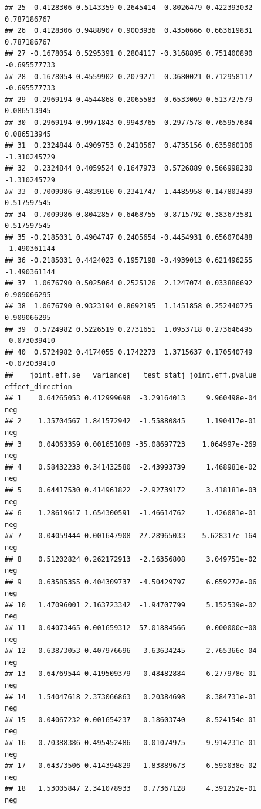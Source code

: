 \documentclass[
]{article}
\begin{document}
\begin{verbatim}
## 25  0.4128306 0.5143359 0.2645414  0.8026479 0.422393032  0.787186767
## 26  0.4128306 0.9488907 0.9003936  0.4350666 0.663619831  0.787186767
## 27 -0.1678054 0.5295391 0.2804117 -0.3168895 0.751400890 -0.695577733
## 28 -0.1678054 0.4559902 0.2079271 -0.3680021 0.712958117 -0.695577733
## 29 -0.2969194 0.4544868 0.2065583 -0.6533069 0.513727579  0.086513945
## 30 -0.2969194 0.9971843 0.9943765 -0.2977578 0.765957684  0.086513945
## 31  0.2324844 0.4909753 0.2410567  0.4735156 0.635960106 -1.310245729
## 32  0.2324844 0.4059524 0.1647973  0.5726889 0.566998230 -1.310245729
## 33 -0.7009986 0.4839160 0.2341747 -1.4485958 0.147803489  0.517597545
## 34 -0.7009986 0.8042857 0.6468755 -0.8715792 0.383673581  0.517597545
## 35 -0.2185031 0.4904747 0.2405654 -0.4454931 0.656070488 -1.490361144
## 36 -0.2185031 0.4424023 0.1957198 -0.4939013 0.621496255 -1.490361144
## 37  1.0676790 0.5025064 0.2525126  2.1247074 0.033886692  0.909066295
## 38  1.0676790 0.9323194 0.8692195  1.1451858 0.252440725  0.909066295
## 39  0.5724982 0.5226519 0.2731651  1.0953718 0.273646495 -0.073039410
## 40  0.5724982 0.4174055 0.1742273  1.3715637 0.170540749 -0.073039410
##    joint.eff.se   variancej   test_statj joint.eff.pvalue effect_direction
## 1    0.64265053 0.412999698  -3.29164013     9.960498e-04              neg
## 2    1.35704567 1.841572942  -1.55880845     1.190417e-01              neg
## 3    0.04063359 0.001651089 -35.08697723    1.064997e-269              neg
## 4    0.58432233 0.341432580  -2.43993739     1.468981e-02              neg
## 5    0.64417530 0.414961822  -2.92739172     3.418181e-03              neg
## 6    1.28619617 1.654300591  -1.46614762     1.426081e-01              neg
## 7    0.04059444 0.001647908 -27.28965033    5.628317e-164              neg
## 8    0.51202824 0.262172913  -2.16356808     3.049751e-02              neg
## 9    0.63585355 0.404309737  -4.50429797     6.659272e-06              neg
## 10   1.47096001 2.163723342  -1.94707799     5.152539e-02              neg
## 11   0.04073465 0.001659312 -57.01884566     0.000000e+00              neg
## 12   0.63873053 0.407976696  -3.63634245     2.765366e-04              neg
## 13   0.64769544 0.419509379   0.48482884     6.277978e-01              neg
## 14   1.54047618 2.373066863   0.20384698     8.384731e-01              neg
## 15   0.04067232 0.001654237  -0.18603740     8.524154e-01              neg
## 16   0.70388386 0.495452486  -0.01074975     9.914231e-01              neg
## 17   0.64373506 0.414394829   1.83889673     6.593038e-02              neg
## 18   1.53005847 2.341078933   0.77367128     4.391252e-01              neg

\end{verbatim}
\end{document}
